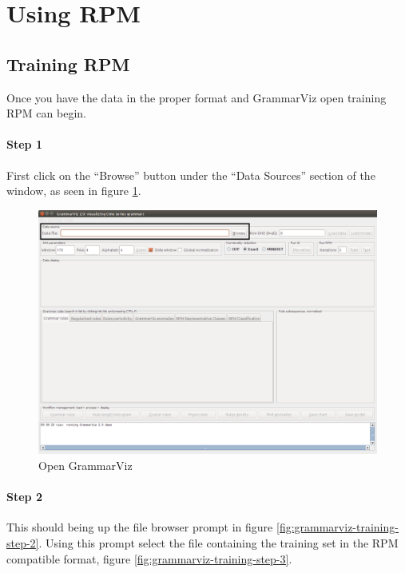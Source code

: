 \documentclass[letterpaper, 12pt]{article}
\begin{document}
\newpage
\section{Using RPM}

\subsection{Training RPM}
Once you have the data in the proper format and GrammarViz open training RPM can begin.

\paragraph{Step 1}
First click on the ``Browse'' button under the ``Data Sources'' section of the window, as seen in figure \ref{fig:grammarviz-training-step-1}. 

\begin{figure}[h]
  \includegraphics[width=\textwidth]{grammarviz-training-step-1}
  \caption{Open GrammarViz}
  \label{fig:grammarviz-training-step-1}
\end{figure}
\newpage
\paragraph{Step 2}
This should being up the file browser prompt in figure \ref{fig:grammarviz-training-step-2}. Using this prompt select the file containing the training set in the RPM compatible format, figure \ref{fig:grammarviz-training-step-3}.
\end{document}
